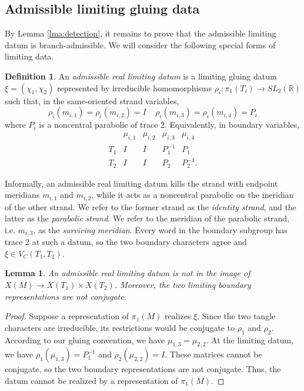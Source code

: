 \documentclass{article}
\theoremstyle{plain}
\theoremstyle{definition}
\newtheorem{definition}[theorem]{Definition}
\theoremstyle{plain}
\theoremstyle{plain}
\theoremstyle{plain}
\newtheorem{lemma}[theorem]{Lemma}
\theoremstyle{remark}
\theoremstyle{remark}
\theoremstyle{plain}
\theoremstyle{plain}
\newcounter{main}
\theoremstyle{plain}
\theoremstyle{plain}
\begin{document}
\subsection{Admissible limiting gluing data}

By Lemma \ref{lma:detection}, it remains to prove that the admissible limiting datum is branch-admissible. We will consider the following special forms of limiting data.

\begin{definition}\label{def:admissible}
An \emph{admissible real limiting datum} is a limiting gluing datum $\xi = (\chi_1, \chi_2)$ represented by irreducible homomorphisms $\rho_i: \pi_1(T_i) \to SL_2(\mathbb{R})$ such that, in the same-oriented strand variables,
\begin{equation}\label{eq:admissible1}
	\rho_i(m_{i, 1}) = \rho_i(m_{i, 2}) = I \ \ \ \ \ \rho_i(m_{i, 3}) = \rho_i(m_{i, 4}) = P_i
\end{equation}
where $P_i$ is a noncentral parabolic of trace 2. Equivalently, in boundary variables, 
\begin{equation}\label{eq:admissible2} \begin{array}{c|cccc} &\mu_{i,1}&\mu_{i,2}&\mu_{i,3}&\mu_{i,4}\\ \hline T_1&I&I&P_1^{-1}&P_1\\ T_2&I&I&P_2&P_2^{-1}. \end{array} \end{equation}
\end{definition}

Informally, an admissible real limiting datum kills the strand with endpoint meridians $m_{i, 1}$ and $m_{i, 2}$, while it acts as a noncentral parabolic on the meridian of the other strand. We refer to the former strand as the \emph{identity strand}, and the latter as the \emph{parabolic strand}. We refer to the meridian of the parabolic strand, i.e. $m_{i, 3}$, as the \emph{surviving meridian}. Every word in the boundary subgroup has trace 2 at such a datum, so the two boundary characters agree and $\xi \in V_C(T_1, T_2)$. 

\begin{lemma}\label{lma:unrealized}
An admissible real limiting datum is not in the image of $X(M) \to X(T_1) \times X(T_2)$. Moreover, the two limiting boundary representations are not conjugate.
\end{lemma}

\begin{proof}
Suppose a representation of $\pi_1(M)$ realizes $\xi$. Since the two tangle characters are irreducible, its restrictions would be conjugate to $\rho_1$ and $\rho_2$. According to our gluing convention, we have $\mu_{1, 3} = \mu_{2, 2}$. At the limiting datum, we have $\rho_1(\mu_{1, 3}) = P_1^{-1}$ and $\rho_2(\mu_{2, 2}) = I$. These matrices cannot be conjugate, so the two boundary representations are not conjugate. Thus, the datum cannot be realized by a representation of $\pi_1(M)$.
\end{proof}
\end{document}
